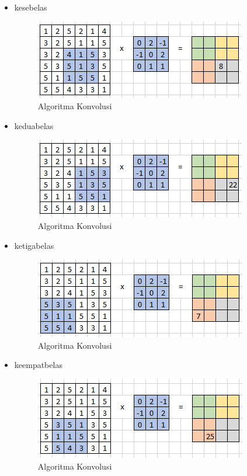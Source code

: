 \begin{itemize}
\begin{itemize}
		\item kesebelas
			\begin{figure}[H]
				\centering
				\includegraphics[scale=1]{figures/1174083/figures7/21.png}
				\caption{Algoritma Konvolusi}
			\end{figure}
			
		\item keduabelas
			\begin{figure}[H]
				\centering
				\includegraphics[scale=1]{figures/1174083/figures7/22.png}
				\caption{Algoritma Konvolusi}
			\end{figure}
			
		\item ketigabelas
			\begin{figure}[H]
				\centering
				\includegraphics[scale=1]{figures/1174083/figures7/23.png}
				\caption{Algoritma Konvolusi}
			\end{figure}
			
		\item keempatbelas
			\begin{figure}[H]
				\centering
				\includegraphics[scale=1]{figures/1174083/figures7/24.png}
				\caption{Algoritma Konvolusi}
			\end{figure}
			

\end{itemize}
\end{itemize}
